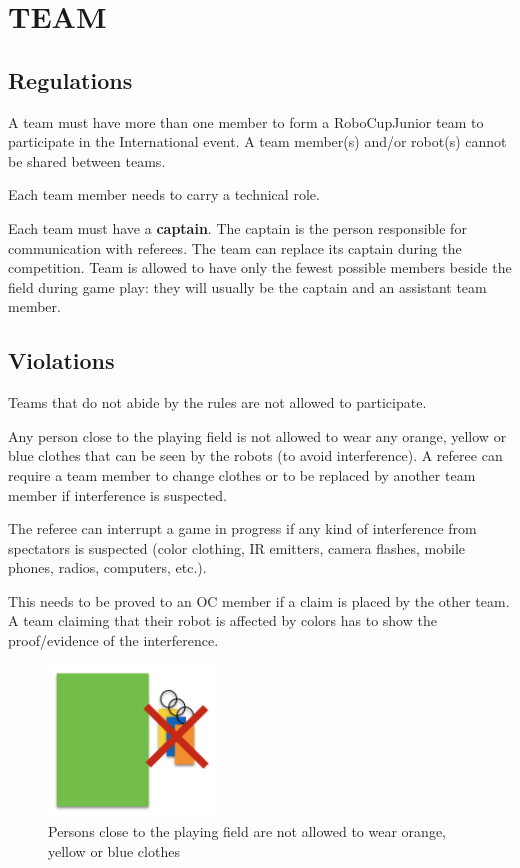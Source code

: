 \documentclass{article}
\begin{document}
\section{TEAM \label{ref-015}}

\subsection{Regulations \label{ref-016}}

A team must have more than one member to form a RoboCupJunior team to
participate in the International event. A team member(s) and/or robot(s) cannot
be shared between teams.

Each team member needs to carry a technical role.


Each team must have a \textbf{captain}. The captain is the person responsible
for communication with referees. The team can replace its captain during the
competition. Team is allowed to have only the fewest possible members beside
the field during game play: they will usually be the captain and an assistant
team member.

\subsection{Violations \label{ref-017}}

Teams that do not abide by the rules are not allowed to participate.

Any person close to the playing field is not allowed to wear any orange, yellow
or blue clothes that can be seen by the robots (to avoid interference). A
referee can require a team member to change clothes or to be replaced by
another team member if interference is suspected.

The referee can interrupt a game in progress if any kind of interference from
spectators is suspected (color clothing, IR emitters, camera flashes, mobile
phones, radios, computers, etc.).

This needs to be proved to an OC member if a claim is placed by the other team.
A team claiming that their robot is affected by colors has to show the
proof/evidence of the interference.

\begin{figure}[H]
    \centering
    \includegraphics[width=0.4\textwidth]{media/image2.png}
    \caption{Persons close to the playing field are not allowed to wear orange,
        yellow or blue clothes}
    \label{fig:spectators}
\end{figure}
\end{document}
